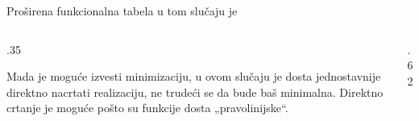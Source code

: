 \begin{frame}[label=03-s017]
\gusttekst
Proširena funkcionalna tabela u tom slučaju je
\begin{columns}[c,onlytextwidth]
\begin{column}{.35\textwidth}


Mada je moguće izvesti minimizaciju, u ovom slučaju je dosta jednostavnije direktno nacrtati realizaciju, ne trudeći se da bude baš minimalna. Direktno crtanje je moguće pošto su funkcije dosta „pravolinijske“.
\end{column}
\begin{column}{.62\textwidth}\centering
\begingroup
\def\DEenable{0}\def\DEjedinica{.9cm}\def\DEgejt{.65}

\endgroup
\end{column}
\end{columns}
\end{frame}
